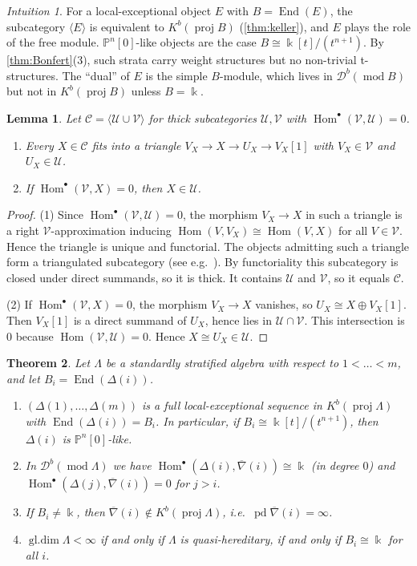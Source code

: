 \documentclass[11pt,reqno]{amsart}
\theoremstyle{plain}
\newtheorem{theorem}{Theorem}[section]
\newtheorem{lemma}[theorem]{Lemma}
\theoremstyle{definition}
\theoremstyle{remark}
\newtheorem*{intuition}{Intuition}
\newcommand{\kk}{\Bbbk}
\DeclareMathOperator{\Hom}{Hom}
\DeclareMathOperator{\End}{End}
\DeclareMathOperator{\gldim}{gl.dim}
\DeclareMathOperator{\pd}{pd}
\newcommand{\modd}{\operatorname{mod}}
\newcommand{\proj}{\operatorname{proj}}
\newcommand{\Db}{\mathcal{D}^b}
\newcommand{\Kb}{K^b}
\newcommand{\thick}[1]{\langle #1\rangle}
\newcommand{\Pn}[2]{\mathbb{P}^{#1}[#2]}
\newcommand{\nablabar}{\overline{\nabla}}
\newcommand{\cC}{\mathcal{C}}
\newcommand{\cU}{\mathcal{U}}
\newcommand{\cV}{\mathcal{V}}
\begin{document}
\begin{intuition}
For a local-exceptional object $E$ with $B=\End(E)$, the subcategory $\thick{E}$ is equivalent to $\Kb(\proj B)$ (\cref{thm:keller}), and $E$ plays the role of the free module. $\Pn n0$-like objects are the case $B\cong\kk[t]/(t^{n+1})$. By \cref{thm:Bonfert}(3), such strata carry weight structures but no non-trivial t-structures. The ``dual'' of $E$ is the simple $B$-module, which lives in $\Db(\modd B)$ but not in $\Kb(\proj B)$ unless $B=\kk$.
\end{intuition}

\begin{lemma}\label{lem:sod}
Let $\cC=\thick{\cU\cup\cV}$ for thick subcategories $\cU,\cV$ with $\Hom^\bullet(\cV,\cU)=0$.
\begin{enumerate}
\item Every $X\in\cC$ fits into a triangle $V_X\to X\to U_X\to V_X[1]$ with $V_X\in\cV$ and $U_X\in\cU$.
\item If $\Hom^\bullet(\cV,X)=0$, then $X\in\cU$.
\end{enumerate}
\end{lemma}

\begin{proof}
(1) Since $\Hom^\bullet(\cV,\cU)=0$, the morphism $V_X\to X$ in such a triangle is a right $\cV$-approximation inducing $\Hom(V,V_X)\cong\Hom(V,X)$ for all $V\in\cV$. Hence the triangle is unique and functorial. The objects admitting such a triangle form a triangulated subcategory (see e.g.\ \cite{Bon89,BK89}). By functoriality this subcategory is closed under direct summands, so it is thick. It contains $\cU$ and $\cV$, so it equals $\cC$.

(2) If $\Hom^\bullet(\cV,X)=0$, the morphism $V_X\to X$ vanishes, so $U_X\cong X\oplus V_X[1]$. Then $V_X[1]$ is a direct summand of $U_X$, hence lies in $\cU\cap\cV$. This intersection is $0$ because $\Hom(\cV,\cU)=0$. Hence $X\cong U_X\in\cU$.
\end{proof}

\begin{theorem}\label{thm:C}
Let $\Lambda$ be a standardly stratified algebra with respect to $1<\dots<m$, and let $B_i=\End(\Delta(i))$.
\begin{enumerate}
\item $(\Delta(1),\dots,\Delta(m))$ is a full local-exceptional sequence in $\Kb(\proj\Lambda)$ with $\End(\Delta(i))=B_i$. In particular, if $B_i\cong\kk[t]/(t^{n+1})$, then $\Delta(i)$ is $\Pn n0$-like.
\item In $\Db(\modd\Lambda)$ we have $\Hom^\bullet(\Delta(i),\nablabar(i))\cong\kk$ (in degree $0$) and $\Hom^\bullet(\Delta(j),\nablabar(i))=0$ for $j>i$.
\item If $B_i\ne\kk$, then $\nablabar(i)\notin\Kb(\proj\Lambda)$, i.e.\ $\pd\nablabar(i)=\infty$.
\item $\gldim\Lambda<\infty$ if and only if $\Lambda$ is quasi-hereditary, if and only if $B_i\cong\kk$ for all $i$.
\end{enumerate}
\end{theorem}
\end{document}
